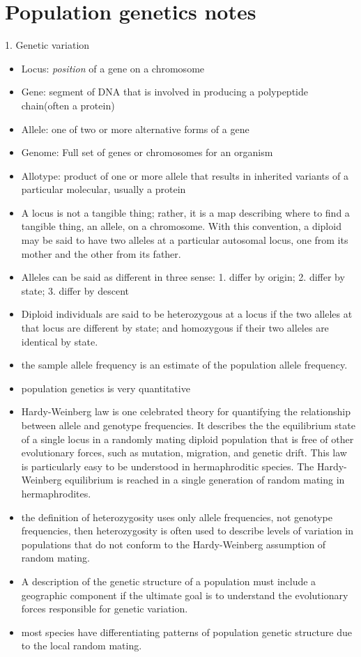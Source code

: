 \documentclass[paper=a4, fontsize=12pt]{scrartcl}	%
\numberwithin{equation}{section}					%
\numberwithin{figure}{section}					%
\numberwithin{table}{section}					%
\begin{document}
\section{Population genetics notes}
1. Genetic variation
\begin{itemize}
\item Locus: \emph{position} of a gene on a chromosome
\item Gene: segment of DNA that is involved in producing a polypeptide chain(often a protein)
\item Allele: one of two or more alternative forms of a gene
\item Genome: Full set of genes or chromosomes for an organism
\item Allotype: product of one or more allele that results in inherited variants of a particular molecular, usually a protein
\item A locus is not a tangible thing; rather, it is a map describing where to find a tangible thing, an allele, on a chromosome. With this convention, a diploid may be said to have two alleles at a particular autosomal locus, one from its mother and the other from its father. 
\item Alleles can be said as different in three sense: 1. differ by origin; 2. differ by state; 3. differ by descent 
\item Diploid individuals are said to be heterozygous at a locus if the two alleles at that locus are different by state; and homozygous if their two alleles are identical by state. 
\item the sample allele frequency is an estimate of the population allele frequency. 
\item population genetics is very quantitative
\item Hardy-Weinberg law is one celebrated theory for quantifying the relationship between allele and genotype frequencies. It describes the the equilibrium state of a single locus in a randomly mating diploid population that is free of other evolutionary forces, such as mutation, migration, and genetic drift. This law is particularly easy to be understood in hermaphroditic species. The Hardy-Weinberg equilibrium is reached in a single generation of random mating in hermaphrodites. 
\item the definition of heterozygosity uses only allele frequencies, not genotype frequencies, then heterozygosity is often used to describe levels of variation in populations that do not conform to the Hardy-Weinberg assumption of random mating. 
\item A description of the genetic structure of a population must include a geographic component if the ultimate goal is to understand the evolutionary forces responsible for genetic variation. 
\item most species have differentiating patterns of population genetic structure due to the local random mating. 
\end{itemize}
\end{document}
